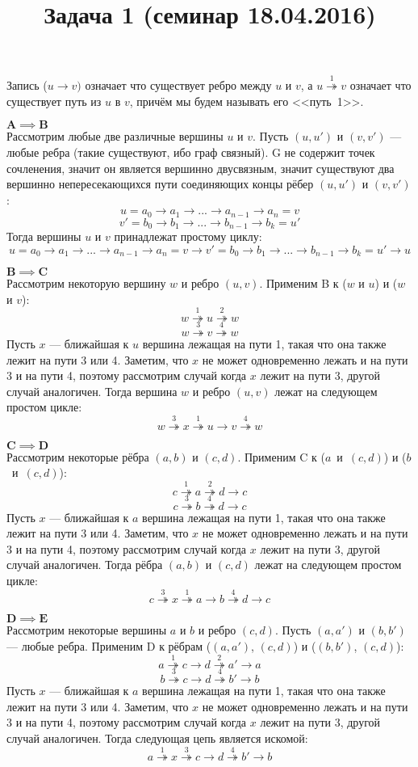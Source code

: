 \documentclass{article}
\title{Задача 1 (семинар 18.04.2016)}
\author{}
\date{}
\newcommand{\mimplies}[2]{$\mathbf{#1 \implies #2}$}
\newcommand{\way}[2]{#1_0 \to #1_1 \to ... \to #1_{n-1} \to #1_#2}
\newcommand{\waya}{\way{a}{n}}
\newcommand{\wayb}{\way{b}{k}}
\newcommand{\mto}[1]{\overset{#1}{\twoheadrightarrow}}
\newcommand{\mtoa}{\mto{1}}
\newcommand{\mtob}{\mto{2}}
\newcommand{\mtoc}{\mto{3}}
\newcommand{\mtod}{\mto{4}}
\begin{document}
\maketitle

Запись ($u \to v)$ означает что существует ребро между $u$ и $v$, а $u \mtoa v$ означает что существует путь из $u$ в $v$, причём мы будем называть его <<путь~1>>.

\mimplies{A}{B}\\
Рассмотрим любые две различные вершины $u$ и $v$. Пусть $(u, u')$ и $(v, v')$ --- любые ребра (такие существуют, ибо граф связный). G не содержит точек сочленения, значит он является вершинно двусвязным, значит существуют два вершинно непересекающихся пути соединяющих концы рёбер $(u, u')$ и $(v, v')$:
$$u= \waya =v$$
$$v'= \wayb =u'$$
Тогда вершины $u$ и $v$ принадлежат простому циклу:
$$u= \waya =v \to v'= \wayb =u' \to u$$

\mimplies{B}{C}\\
Рассмотрим некоторую вершину $w$ и ребро $(u, v)$. Применим B к ($w$ и $u$) и ($w$ и $v$):
$$w \mtoa u \mtob w$$
$$w \mtoc v \mtod w$$
Пусть $x$ --- ближайшая к $u$ вершина лежащая на пути 1, такая что она также лежит на пути 3 или 4. Заметим, что $x$ не может одновременно лежать и на пути 3 и на пути 4, поэтому рассмотрим случай когда $x$ лежит на пути 3, другой случай аналогичен. Тогда вершина $w$ и ребро $(u, v)$ лежат на следующем простом цикле:
$$w \mtoc x \mtoa u \to v \mtod w$$

\mimplies{C}{D}\\
Рассмотрим некоторые рёбра $(a, b)$ и $(c, d)$. Применим C к ($a$~и~$(c, d)$) и ($b$~и~$(c, d)$):
$$c \mtoa a \mtob d \to c$$
$$c \mtoc b \mtod d \to c$$
Пусть $x$ --- ближайшая к $a$ вершина лежащая на пути 1, такая что она также лежит на пути 3 или 4. Заметим, что $x$ не может одновременно лежать и на пути 3 и на пути 4, поэтому рассмотрим случай когда $x$ лежит на пути 3, другой случай аналогичен. Тогда рёбра $(a, b)$ и $(c, d)$ лежат на следующем простом цикле:
$$c \mtoc x \mtoa a \to b \mtod d \to c$$

\mimplies{D}{E}\\
Рассмотрим некоторые вершины $a$ и $b$ и ребро $(c, d)$. Пусть $(a, a')$ и $(b, b')$ --- любые ребра. Применим D к рёбрам ($(a, a')$, $(c, d)$) и ($(b, b')$, $(c, d)$):
$$a \mtoa c \to d \mtob a' \to a$$
$$b \mtoc c \to d \mtod b' \to b$$
Пусть $x$ --- ближайшая к $a$ вершина лежащая на пути 1, такая что она также лежит на пути 3 или 4. Заметим, что $x$ не может одновременно лежать и на пути 3 и на пути 4, поэтому рассмотрим случай когда $x$ лежит на пути 3, другой случай аналогичен. Тогда следующая цепь является искомой:
$$a \mtoa x \mtoc c \to d \mtod b' \to b$$
\end{document}
